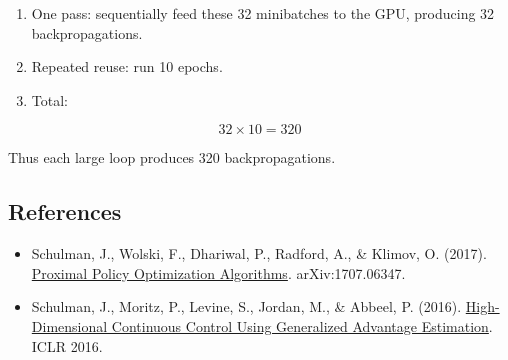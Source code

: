 \begin{enumerate}
\def\labelenumi{\arabic{enumi}.}
\setcounter{enumi}{1}
\tightlist
\item
  One pass: sequentially feed these 32 minibatches to the GPU, producing 32 backpropagations.
\item
  Repeated reuse: run 10 epochs.
\item
{}
  Total:
\end{enumerate}

\[
32\times 10=320
\]

Thus each large loop produces 320 backpropagations.

\FloatBarrier
{}
\hypertarget{references-58}{%
\subsection{References}\label{references-58}}

\vspace{0.25em}
\begin{itemize}
\tightlist
\item
  Schulman, J., Wolski, F., Dhariwal, P., Radford, A., \& Klimov, O. (2017). \href{https://arxiv.org/abs/1707.06347}{Proximal Policy Optimization Algorithms}. arXiv:1707.06347.
\item
  Schulman, J., Moritz, P., Levine, S., Jordan, M., \& Abbeel, P. (2016). \href{https://arxiv.org/abs/1506.02438}{High-Dimensional Continuous Control Using Generalized Advantage Estimation}. ICLR 2016.
\end{itemize}

\clearpage
